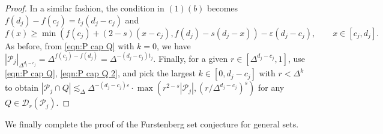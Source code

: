 \documentclass{amsart}
\newcommand{\eps}{\varepsilon}
\newcommand{\lesim}{\lesssim}
\newcommand{\cD}{\mathcal{D}}
\newcommand{\cP}{\mathcal{P}}
\begin{document}
\begin{proof}
In a similar fashion, the condition in $(1)(b)$ becomes $f(d_j) - f(c_j) = t_j (d_j - c_j)$ and
\[
f(x)\geq \min ( f(c_j)+(2-s)(x-c_j), f(d_j) -s(d_j-x))-\eps (d_j-c_j), \qquad x \in [c_j, d_j].
\]
As before, from \eqref{eqn:P cap Q} with $k = 0$, we have $|\cP_j|_{\Delta^{d_j-c_j}} = \Delta^{f(c_j) - f(d_j)} = \Delta^{-(d_j - c_j) t_j}$. Finally, for a given $r \in [\Delta^{d_j-c_j}, 1]$, use \eqref{eqn:P cap Q}, \eqref{eqn:P cap Q 2}, and pick the largest $k \in [0, d_j - c_j]$ with $r < \Delta^k$ to obtain $|\cP_j \cap Q| \lesim_\Delta \Delta^{-(d_j - c_j) \eps} \cdot \max(r^{2-s} |\cP_j|, (r/\Delta^{d_j - c_j})^s)$ for any $Q \in \cD_r (\cP_j)$.

\end{proof}

We finally complete the proof of the Furstenberg set conjecture for general sets.
\end{document}
